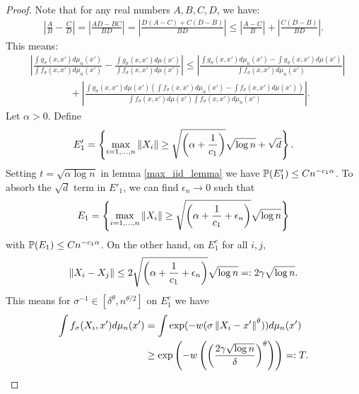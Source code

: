 \begin{proof}
    Note that for any real numbers $A,B,C,D$, we have:
    \begin{align}
        \left|\frac{A}{B}-\frac{C}{D}\right| = \left|\frac{AD-BC}{BD}\right| = \left|\frac{D(A-C)+C(D-B)}{BD}\right| \leq \left|\frac{A-C}{B}\right|+\left|\frac{C(D-B)}{BD} \right|.
    \end{align}
    This means:
    \begin{align} \label{important_lemmas:triangle_inequality}
         & \left|\frac{\int g_{\sigma}(x,x') d\mu_n(x')}{\int f_{\sigma}(x,x') d\mu_n(x')}-\frac{\int g_{\sigma}(x,x') d\mu(x')}{\int f_{\sigma}(x,x') d\mu(x')}\right| \leq \left|\frac{\int g_{\sigma}(x,x') d\mu_n(x')-\int g_{\sigma}(x,x') d\mu(x')}{\int f_{\sigma}(x,x') d\mu_n(x')}\right| \nonumber \\
         & \qquad \qquad + \left|\frac{\int g_{\sigma}(x,x')d\mu(x')(\int f_{\sigma}(x,x') d\mu_n(x')-\int f_{\sigma}(x,x') d\mu(x'))}{\int f_{\sigma}(x,x')d\mu(x')\int f_{\sigma}(x,x') d\mu_n(x')} \right|.
    \end{align}
    Let $\alpha >0$. Define
    \begin{align}
        E'_1 = \left\{\max_{i = 1,\dots,n}\left\lVert X_i\right\rVert \geq \sqrt{\left(\alpha+\frac{1}{c_1}\right)}\sqrt{\log n} + \sqrt{d}\right\}.
    \end{align}
    Setting $t = \sqrt{\alpha \log n}$ in lemma \ref{max_iid_lemma} we have $\mathbb{P}(E'_1) \leq Cn^{-c_1 \alpha}$. To absorb the $\sqrt{d}$ term in $E'_1$, we can find $\epsilon_n \to 0$ such that
    \begin{align}
        E_1 = \left\{\max_{i = 1,\dots,n}\left\lVert X_i\right\rVert \geq \sqrt{\left(\alpha+\frac{1}{c_1}+\epsilon_n \right)}\sqrt{\log n}\right\}
    \end{align}
    with $\mathbb{P}(E_1) \leq Cn^{-c_1 \alpha}$. On the other hand, on $E_1^c$ for all $i,j$,
    \begin{align}
        \left\lVert X_i-X_j\right\rVert \leq 2\sqrt{\left(\alpha+\frac{1}{c_1}+\epsilon_n \right)}\sqrt{\log n} =: 2\gamma \sqrt{\log n}.
    \end{align}
    This means for $\sigma^{-1} \in [\delta^{\theta},n^{\theta/2}]$ on $E_1^c$ we have
    \begin{align} \label{important_lemmas:denominator_bound_1}
        \int f_{\sigma}(X_i,x')d\mu_n(x') & = \int \exp(-w(\sigma\norm{X_i-x'}^{\theta})) d\mu_n(x') \nonumber                                        \\
                                          & \geq \exp \left(-w\left(\left(\frac{2\gamma \sqrt{\log n}}{\delta} \right)^{\theta} \right) \right) =: T.

\end{align}
\end{proof}
